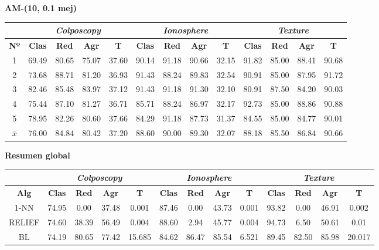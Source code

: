 \documentclass[12pt]{article}
\begin{document}
\textbf{AM-(10, 0.1 mej)}


\begin{table}[h!]
\begin{tabular}{ccccc|cccc|cccc}
 & \multicolumn{4}{c}{\textit{Colposcopy}} & \multicolumn{4}{c}{\textit{Ionosphere}} & \multicolumn{4}{c}{\textit{Texture}} \\ \hline
\textbf{Nº} & \textbf{Clas} & \textbf{Red} & \textbf{Agr} & \textbf{T} & \textbf{Clas} & \textbf{Red} & \textbf{Agr} & \textbf{T} & \textbf{Clas} & \textbf{Red} & \textbf{Agr} & \textbf{T} \\ \hline
1 & 69.49 & 80.65 & 75.07 & 37.60 & 90.14 & 91.18 & 90.66 & 32.15 & 91.82 & 85.00 & 88.41 & 90.68 \\
2 & 73.68 & 88.71 & 81.20 & 36.93 & 91.43 & 88.24 & 89.83 & 32.54 & 90.91 & 85.00 & 87.95 & 91.72 \\
3 & 82.46 & 85.48 & 83.97 & 37.12 & 91.43 & 91.18 & 91.30 & 32.10 & 80.91 & 87.50 & 84.20 & 90.03 \\
4 & 75.44 & 87.10 & 81.27 & 36.71 & 85.71 & 88.24 & 86.97 & 32.17 & 92.73 & 85.00 & 88.86 & 90.88 \\
5 & 78.95 & 82.26 & 80.60 & 37.66 & 84.29 & 91.18 & 87.73 & 31.37 & 84.55 & 85.00 & 84.77 & 90.01 \\
\hline
$\bar{x}$ & 76.00 & 84.84 & 80.42 & 37.20 & 88.60 & 90.00 & 89.30 & 32.07 & 88.18 & 85.50 & 86.84 & 90.66 \\
\end{tabular}
\end{table}

\textbf{Resumen global}

\begin{table}[h]
\begin{tabular}{ccccc|cccc|cccc}
 & \multicolumn{4}{c}{\textit{Colposcopy}} & \multicolumn{4}{c}{\textit{Ionosphere}} & \multicolumn{4}{c}{\textit{Texture}} \\ \hline
\textbf{Alg} & \textbf{Clas} & \textbf{Red} & \textbf{Agr} & \textbf{T} & \textbf{Clas} & \textbf{Red} & \textbf{Agr} & \textbf{T} & \textbf{Clas} & \textbf{Red} & \textbf{Agr} & \textbf{T} \\ \hline
1-NN & 74.95 & 0.00 & 37.48 & 0.001 & 87.46 & 0.00 & 43.73 & 0.001 & 93.82 & 0.00 & 46.91 & 0.002\\
RELIEF & 74.60 & 38.39 & 56.49 & 0.004 & 88.60 & 2.94 & 45.77 & 0.004 & 94.73 & 6.50 & 50.61 & 0.01\\
BL & 74.19 & 80.65 & 77.42 & 15.685 & 84.62 & 86.47 & 85.54 & 6.521 & 89.45 & 82.50 & 85.98 & 20.017\\
\end{tabular}
\end{table}
\end{document}
